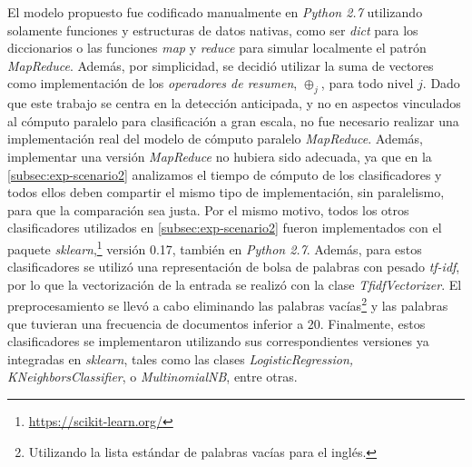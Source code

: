 El modelo propuesto fue codificado manualmente en \emph{Python 2.7} utilizando solamente funciones y estructuras de datos nativas, como ser \emph{dict} para los diccionarios o las funciones \emph{map} y \emph{reduce} para simular localmente el patrón \emph{MapReduce}.
Además, por simplicidad, se decidió utilizar la suma de vectores como implementación de los \emph{operadores de resumen}, $\oplus_j$, para todo nivel $j$.
Dado que este trabajo se centra en la detección anticipada, y no en aspectos vinculados al cómputo paralelo para clasificación a gran escala, no fue necesario realizar una implementación real del modelo de cómputo paralelo \emph{MapReduce}.
Además, implementar una versión \emph{MapReduce} no hubiera sido adecuada, ya que en la \autoref{subsec:exp-scenario2} analizamos el tiempo de cómputo de los clasificadores y todos ellos deben compartir el mismo tipo de implementación, sin paralelismo, para que la comparación sea justa.
Por el mismo motivo, todos los otros clasificadores utilizados en \autoref{subsec:exp-scenario2} fueron implementados con el paquete \emph{sklearn},\footnote{\url{https://scikit-learn.org/}} versión 0.17, también en \emph{Python 2.7}.
Además, para estos clasificadores se utilizó una representación de bolsa de palabras con pesado \emph{tf-idf}, por lo que la vectorización de la entrada se realizó con la clase \emph{TfidfVectorizer}. El preprocesamiento se llevó a cabo eliminando las palabras vacías\footnote{Utilizando la lista estándar de palabras vacías para el inglés.} y las palabras que tuvieran una frecuencia de documentos inferior a 20. Finalmente, estos clasificadores se implementaron utilizando sus correspondientes versiones ya integradas en \emph{sklearn}, tales como las clases \emph{LogisticRegression, KNeighborsClassifier}, o \emph{MultinomialNB}, entre otras.



